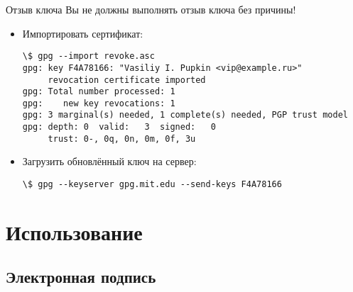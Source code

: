 \documentclass[presentation]{beamer}
\begin{document}
\begin{frame}[fragile]{Отзыв ключа}
  \alert{Вы не должны выполнять отзыв ключа без причины!}\newline

  \begin{itemize}
  \item Импортировать сертификат:
    \footnotesize
\begin{Verbatim}[commandchars=\\\[\]]
\$ gpg --import revoke.asc
gpg: key F4A78166: "Vasiliy I. Pupkin <vip@example.ru>"
     revocation certificate imported
gpg: Total number processed: 1
gpg:    new key revocations: 1
gpg: 3 marginal(s) needed, 1 complete(s) needed, PGP trust model
gpg: depth: 0  valid:   3  signed:   0
     trust: 0-, 0q, 0n, 0m, 0f, 3u
\end{Verbatim}
    \normalsize
  \item Загрузить обновлённый ключ на сервер:
    \footnotesize
\begin{Verbatim}[commandchars=\\\[\]]
\$ gpg --keyserver gpg.mit.edu --send-keys F4A78166
\end{Verbatim}
    \normalsize
  \end{itemize}
\end{frame}



\section{Использование}



\subsection{Электронная подпись}
\end{document}
